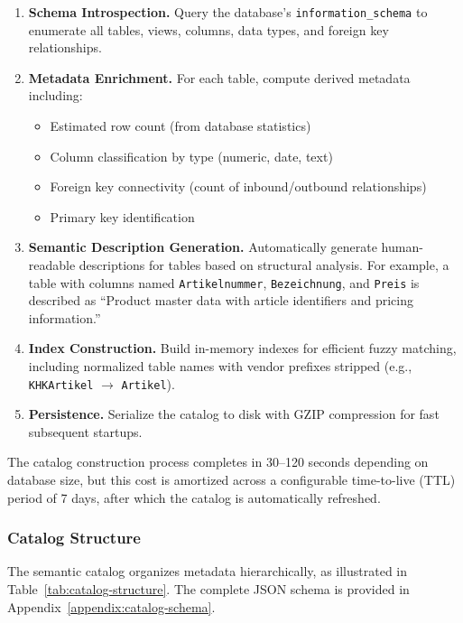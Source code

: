 \begin{enumerate}
    \item \textbf{Schema Introspection.} Query the database's \texttt{information\_schema} to enumerate all tables, views, columns, data types, and foreign key relationships.

    \item \textbf{Metadata Enrichment.} For each table, compute derived metadata including:
    \begin{itemize}
        \item Estimated row count (from database statistics)
        \item Column classification by type (numeric, date, text)
        \item Foreign key connectivity (count of inbound/outbound relationships)
        \item Primary key identification
    \end{itemize}

    \item \textbf{Semantic Description Generation.} Automatically generate human-readable descriptions for tables based on structural analysis. For example, a table with columns named \texttt{Artikelnummer}, \texttt{Bezeichnung}, and \texttt{Preis} is described as ``Product master data with article identifiers and pricing information.''

    \item \textbf{Index Construction.} Build in-memory indexes for efficient fuzzy matching, including normalized table names with vendor prefixes stripped (e.g., \texttt{KHKArtikel} $\rightarrow$ \texttt{Artikel}).

    \item \textbf{Persistence.} Serialize the catalog to disk with GZIP compression for fast subsequent startups.
\end{enumerate}

The catalog construction process completes in 30--120 seconds depending on database size, but this cost is amortized across a configurable time-to-live (TTL) period of 7 days, after which the catalog is automatically refreshed.

\subsubsection{Catalog Structure}

The semantic catalog organizes metadata hierarchically, as illustrated in Table~\ref{tab:catalog-structure}. The complete JSON schema is provided in Appendix~\ref{appendix:catalog-schema}.

